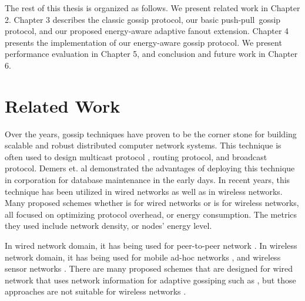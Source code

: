 \documentclass[onehalf,11pt]{beavtex}
\newcommand{\gp}{gossip protocol}
\newcommand{\pp}{push-pull}
\begin{document}
The rest of this thesis is organized as follows. We present related work in Chapter 2. Chapter 3 describes the classic \gp, our basic \pp ~\gp, and our proposed energy-aware adaptive fanout extension. Chapter 4 presents the implementation of our energy-aware \gp. We present performance evaluation in Chapter 5, and conclusion and future work in Chapter 6.





\chapter{Related Work} \label{Chapter2}

Over the years, gossip techniques have proven to be the corner stone for building scalable and robust distributed computer network systems. This technique is often used to design multicast protocol \cite{gupta2002efficient} \cite{gossip} , routing protocol, and broadcast protocol. Demers et. al \cite{demers1987epidemic} demonstrated the advantages of deploying this technique in corporation for database maintenance in the early days. In recent years, this technique has been utilized in wired networks \cite{birman1999bimodal} as well as in wireless networks. Many proposed schemes whether is for wired networks or is for wireless networks, all focused on optimizing protocol overhead, or energy consumption. The metrics they used include network density, or nodes' energy level. 

In wired network domain, it has being used for peer-to-peer network \cite{gupta2002efficient}. In wireless network domain, it has being used for mobile ad-hoc networks \cite{chandra2001anonymous} \cite{vahdat2000epidemic}, and wireless sensor networks \cite{levis2004trickle} \cite{miller2005exploring}. There are many proposed schemes that are designed for wired network that uses network information for adaptive gossiping such as \cite{kempe2004spatial} \cite{rodrigues2003adaptive}, but those approaches are not suitable for wireless networks \cite{smart}. 
\end{document}
